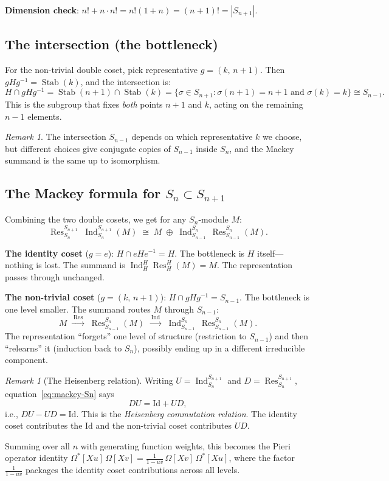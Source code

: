 \documentclass[12pt,a4paper]{article}
\theoremstyle{definition}
\theoremstyle{remark}
\newtheorem{remark}[theorem]{Remark}
\newcommand{\Ind}{\operatorname{Ind}}
\newcommand{\Res}{\operatorname{Res}}
\newcommand{\Stab}{\operatorname{Stab}}
\begin{document}
\textbf{Dimension check}: $n! + n \cdot n! = n!(1 + n) = (n+1)!
= |S_{n+1}|$. \checkmark

\subsection{The intersection (the bottleneck)}

For the non-trivial double coset, pick representative $g = (k,\, n{+}1)$.
Then $gHg^{-1} = \Stab(k)$, and the intersection is:
\[
  H \cap gHg^{-1} = \Stab(n{+}1) \cap \Stab(k)
  = \{\sigma \in S_{n+1} : \sigma(n{+}1) = n{+}1 \text{ and } \sigma(k) = k\}
  \cong S_{n-1}.
\]
This is the subgroup that fixes \emph{both} points $n{+}1$ and $k$,
acting on the remaining $n-1$ elements.

\begin{remark}
The intersection $S_{n-1}$ depends on which representative $k$ we
choose, but different choices give conjugate copies of $S_{n-1}$ inside
$S_n$, and the Mackey summand is the same up to isomorphism.
\end{remark}

\subsection{The Mackey formula for $S_n \subset S_{n+1}$}

Combining the two double cosets, we get for any $S_n$-module $M$:
\begin{equation}\label{eq:mackey-Sn}
  \boxed{
  \Res_{S_n}^{S_{n+1}}\;\Ind_{S_n}^{S_{n+1}}(M)
  \;\cong\;
  M \;\oplus\; \Ind_{S_{n-1}}^{S_n}\,\Res_{S_{n-1}}^{S_n}(M).
  }
\end{equation}

\medskip\noindent\textbf{The identity coset} ($g = e$):
$H \cap eHe^{-1} = H$. The bottleneck is $H$ itself---nothing is
lost. The summand is $\Ind_H^H \Res_H^H(M) = M$. The representation
passes through unchanged.

\medskip\noindent\textbf{The non-trivial coset} ($g = (k,\, n{+}1)$):
$H \cap gHg^{-1} = S_{n-1}$. The bottleneck is one level smaller.
The summand routes $M$ through $S_{n-1}$:
\[
  M \;\xrightarrow{\;\Res\;}\;
  \Res_{S_{n-1}}^{S_n}(M) \;\xrightarrow{\;\Ind\;}\;
  \Ind_{S_{n-1}}^{S_n}\,\Res_{S_{n-1}}^{S_n}(M).
\]
The representation ``forgets'' one level of structure (restriction
to $S_{n-1}$) and then ``relearns'' it (induction back to $S_n$),
possibly ending up in a different irreducible component.

\begin{remark}[The Heisenberg relation]\label{rem:heisenberg}
Writing $U = \Ind_{S_n}^{S_{n+1}}$ and $D = \Res_{S_n}^{S_{n+1}}$,
equation~\eqref{eq:mackey-Sn} says
\[
  DU = \mathrm{Id} + UD,
\]
i.e., $DU - UD = \mathrm{Id}$. This is the \emph{Heisenberg
commutation relation}. The identity coset contributes the
$\mathrm{Id}$ and the non-trivial coset contributes $UD$.

Summing over all $n$ with generating function weights, this becomes
the Pieri operator identity
$\Omega^*[Xu]\,\Omega[Xv] = \frac{1}{1-uv}\,\Omega[Xv]\,\Omega^*[Xu]$,
where the factor $\frac{1}{1-uv}$ packages the identity coset
contributions across all levels.
\end{remark}
\end{document}
